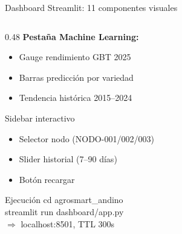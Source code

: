 \documentclass[14pt,aspectratio=169]{beamer}
\begin{document}
\begin{frame}{Dashboard Streamlit: 11 componentes visuales}
\begin{columns}[T]
    \begin{column}{0.48\textwidth}
      \textbf{Pesta\~na Machine Learning:}
      \begin{itemize}\small
        \item Gauge rendimiento GBT 2025
        \item Barras predicci\'on por variedad
        \item Tendencia hist\'orica 2015--2024
      \end{itemize}
      \vspace{0.3em}
      \begin{block}{Sidebar interactivo}
        \begin{itemize}\small
          \item Selector nodo (NODO-001/002/003)
          \item Slider historial (7--90 d\'ias)
          \item Bot\'on recargar
        \end{itemize}
      \end{block}
      \vspace{0.3em}
      \begin{exampleblock}{Ejecuci\'on}
        \scriptsize\ttfamily
        cd agrosmart\_andino\\
        streamlit run dashboard/app.py\\
        \textrm{\footnotesize $\Rightarrow$ localhost:8501, TTL 300s}
      \end{exampleblock}
    \end{column}
  \end{columns}
\end{frame}
\end{document}
